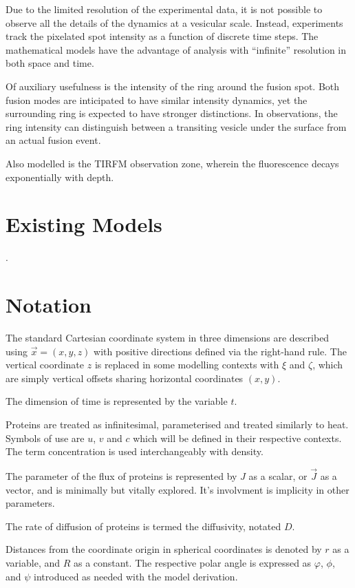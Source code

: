 \documentclass{report}
\begin{document}
Due to the limited resolution of the experimental data, it is not possible to observe all the details of the dynamics at a vesicular scale. Instead, experiments track the pixelated spot intensity as a function of discrete time steps. The mathematical models have the advantage of analysis with ``infinite'' resolution in both space and time.

Of auxiliary usefulness is the intensity of the ring around the fusion spot. Both fusion modes are inticipated to have similar intensity dynamics, yet the surrounding ring is expected to have stronger distinctions. In observations, the ring intensity can distinguish between a transiting vesicle under the surface from an actual fusion event.

Also modelled is the TIRFM observation zone, wherein the fluorescence decays exponentially with depth.

\section{Existing Models}
\cite{marrink2019computational}.

\section{Notation}
The standard Cartesian coordinate system in three dimensions are described using $\vec{x} = (x, y, z)$ with positive directions defined via the right-hand rule. The vertical coordinate $z$ is replaced in some modelling contexts with $\xi$ and $\zeta$, which are simply vertical offsets sharing horizontal coordinates $(x, y)$.

The dimension of time is represented by the variable $t$.

Proteins are treated as infinitesimal, parameterised and treated similarly to heat. Symbols of use are $u$, $v$ and $c$ which will be defined in their respective contexts. The term concentration is used interchangeably with density.

The parameter of the flux of proteins is represented by $J$ as a scalar, or $\vec{J}$ as a vector, and is minimally but vitally explored. It's involvment is implicity in other parameters.

The rate of diffusion of proteins is termed the diffusivity, notated $D$.

Distances from the coordinate origin in spherical coordinates is denoted by $r$ as a variable, and $R$ as a constant. The respective polar angle is expressed as $\varphi$, $\phi$, and $\psi$ introduced as needed with the model derivation.
\end{document}
